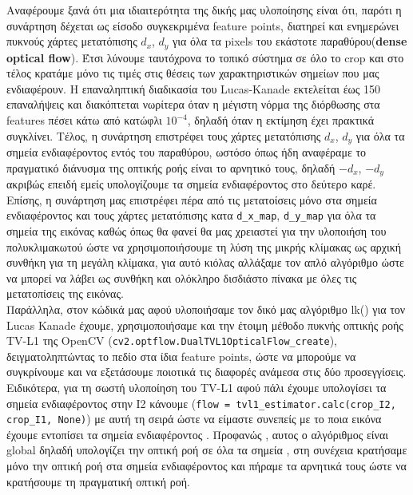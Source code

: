 \documentclass[12pt, a4paper]{article}
\begin{document}
Αναφέρουμε ξανά ότι μια ιδιαιτερότητα της δικής μας υλοποίησης είναι ότι, παρότι η συνάρτηση δέχεται ως είσοδο συγκεκριμένα feature points, διατηρεί και ενημερώνει πυκνούς χάρτες μετατόπισης $d_x$, $d_y$ για όλα τα pixels του εκάστοτε παραθύρου(\textbf{dense optical flow}). Έτσι λύνουμε ταυτόχρονα το τοπικό σύστημα σε όλο το crop και στο τέλος κρατάμε μόνο τις τιμές στις θέσεις των χαρακτηριστικών σημείων που μας ενδιαφέρουν.
Η επαναληπτική διαδικασία του Lucas-Kanade εκτελείται έως 150 επαναλήψεις και διακόπτεται νωρίτερα όταν η μέγιστη νόρμα της διόρθωσης στα features πέσει κάτω από κατώφλι $10^{-4}$, δηλαδή όταν η εκτίμηση έχει πρακτικά συγκλίνει.
Τέλος, η συνάρτηση επιστρέφει τους χάρτες μετατόπισης $d_x$, $d_y$ για όλα τα σημεία ενδιαφέροντος εντός του  παραθύρου, ωστόσο όπως ήδη αναφέραμε το πραγματικό διάνυσμα της οπτικής ροής είναι το αρνητικό τους, δηλαδή $-d_x$, $-d_y$ ακριβώς επειδή εμείς υπολογίζουμε τα σημεία ενδιαφέροντος στο δεύτερο καρέ.
Επίσης, η συνάρτηση μας επιστρέφει πέρα από τις μετατοίσεις μόνο στα σημεία ενδιαφέροντος και τους χάρτες μετατόπισης κατα \texttt{d\_x\_map}, \texttt{d\_y\_map} για όλα τα σημεία της εικόνας καθώς όπως 
θα φανεί θα μας χρειαστεί για την υλοποιήση του πολυκλιμακωτού ώστε να χρησιμοποιήσουμε τη λύση
της μικρής κλίμακας ως αρχική συνθήκη για τη μεγάλη κλίμακα, για αυτό κιόλας αλλάξαμε τον απλό αλγόριθμο ώστε να μπορεί να λάβει ως συνθήκη και ολόκληρο δισδιάστο πίνακα με όλες τις μετατοπίσεις της εικόνας. \\

Παράλληλα, στον κώδικά μας αφού υλοποιήσαμε τον δικό μας αλγόριθμο lk()  για τον Lucas Kanade έχουμε, χρησιμοποιήσαμε και  την έτοιμη μέθοδο πυκνής οπτικής ροής TV-L1 της OpenCV (\texttt{cv2.optflow.DualTVL1OpticalFlow\_create}), δειγματοληπτώντας το πεδίο στα ίδια feature points, ώστε να μπορούμε να συγκρίνουμε και να  εξετάσουμε ποιοτικά τις διαφορές ανάμεσα στις δύο προσεγγίσεις.
Ειδικότερα, για τη σωστή υλοποίηση του TV-L1 αφού πάλι έχουμε υπολογίσει τα σημεία ενδιαφέροντος στην Ι2 κάνουμε (\texttt{flow = tvl1\_estimator.calc(crop\_I2, crop\_I1, None)}) με αυτή τη σειρά ώστε να είμαστε συνεπείς με το ποια εικόνα έχουμε εντοπίσει τα σημεία ενδιαφέροντος . Προφανώς , αυτος ο αλγόριθμος είναι global δηλαδή υπολογίζει
την οπτική ροή σε όλα τα σημεία , στη συνέχεια κρατήσαμε μόνο την οπτική ροή στα σημεία ενδιαφέροντος και πήραμε τα αρνητικά τους ώστε να κρατήσουμε τη πραγματική οπτική ροή. \\
\end{document}
